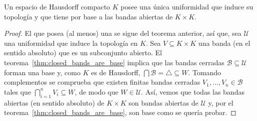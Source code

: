 \documentclass[topologia-analisis.tex]{subfiles}
\begin{document}


\begin{thm}
	Un espacio de Hausdorff compacto $K$ posee una única uniformidad que induce su topología y que tiene por base a las
	bandas abiertas de $K \times K$.
\end{thm}
\begin{proof}
	El que posea (al menos) una se sigue del teorema anterior, así que, sea $\mathcal{U}$ una uniformidad que induce la topología en $K$.
	Sea $V \subseteq K \times K$ una banda (en el sentido absoluto) que es un subconjunto abierto.
	El teorema~\ref{thm:closed_bands_are_base} implica que las bandas cerradas $\mathcal{B \subseteq U}$ forman una base y, como $K$ es de Hausdorff,
	$\bigcap \mathcal{B} = \triangle \subseteq W$.
	Tomando complementos se comprueba que existen finitas bandas cerradas $V_1, \dots, V_n \in \mathcal{B}$ tales que $\bigcap_{i=1}^{n} V_i \subseteq W$,
	de modo que $W \in \mathcal{U}$.
	Así, vemos que todas las bandas abiertas (en sentido absoluto) de $K\times K$ son bandas abiertas de $\mathcal{U}$ y,
	por el teorema~\ref{thm:closed_bands_are_base}, son base como se quería probar.
\end{proof}
\end{document}
